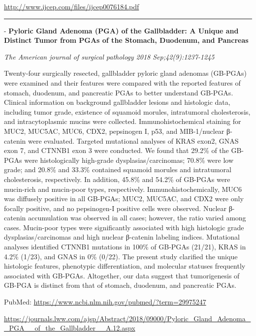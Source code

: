 \documentclass[]{article}
\begin{document}
\url{http://www.ijcep.com/files/ijcep0076184.pdf}

\begin{center}\rule{0.5\linewidth}{\linethickness}\end{center}

 - \textbf{Pyloric Gland Adenoma (PGA) of the Gallbladder: A Unique and
Distinct Tumor from PGAs of the Stomach, Duodenum, and Pancreas}

\emph{The American journal of surgical pathology 2018
Sep;42(9):1237-1245}

Twenty-four surgically resected, gallbladder pyloric gland adenomas
(GB-PGAs) were examined and their features were compared with the
reported features of stomach, duodenum, and pancreatic PGAs to better
understand GB-PGAs. Clinical information on background gallbladder
lesions and histologic data, including tumor grade, existence of
squamoid morules, intratumoral cholesterosis, and intracytoplasmic
mucins were collected. Immunohistochemical staining for MUC2, MUC5AC,
MUC6, CDX2, pepsinogen I, p53, and MIB-1/nuclear β-catenin were
evaluated. Targeted mutational analyses of KRAS exon2, GNAS exon 7, and
CTNNB1 exon 3 were conducted. We found that 29.2\% of the GB-PGAs were
histologically high-grade dysplasias/carcinomas; 70.8\% were low grade;
and 20.8\% and 33.3\% contained squamoid morules and intratumoral
cholesterosis, respectively. In addition, 45.8\% and 54.2\% of GB-PGAs
were mucin-rich and mucin-poor types, respectively.
Immunohistochemically, MUC6 was diffusely positive in all GB-PGAs; MUC2,
MUC5AC, and CDX2 were only focally positive, and no pepsinogen-I
positive cells were observed. Nuclear β-catenin accumulation was
observed in all cases; however, the ratio varied among cases. Mucin-poor
types were significantly associated with high histologic grade
dysplasias/carcinomas and high nuclear β-catenin labeling indices.
Mutational analyses identified CTNNB1 mutations in 100\% of GB-PGAs
(21/21), KRAS in 4.2\% (1/23), and GNAS in 0\% (0/22). The present study
clarified the unique histologic features, phenotypic differentiation,
and molecular statuses frequently associated with GB-PGAs. Altogether,
our data suggest that tumorigenesis of GB-PGA is distinct from that of
stomach, duodenum, and pancreatic PGAs.

PubMed: \url{https://www.ncbi.nlm.nih.gov/pubmed/?term=29975247}

\url{https://journals.lww.com/ajsp/Abstract/2018/09000/Pyloric_Gland_Adenoma__PGA__of_the_Gallbladder__A.12.aspx}
\end{document}
